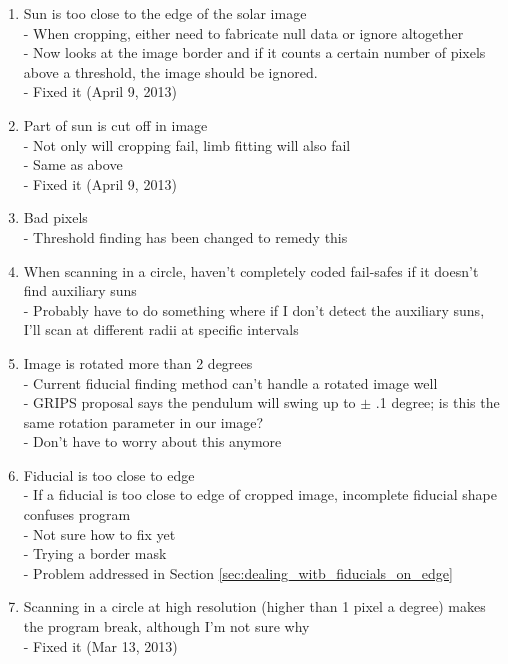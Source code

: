 \documentclass[10pt]{article}
\begin{document}
    \begin{enumerate}
        \item Sun is too close to the edge of the solar image\\
            - When cropping, either need to fabricate null data or ignore altogether\\
            - Now looks at the image border and if it counts a certain number of pixels above a threshold, the image should be ignored.\\
            - Fixed it (April 9, 2013)
        \item Part of sun is cut off in image\\
            - Not only will cropping fail, limb fitting will also fail\\
            - Same as above\\
            - Fixed it (April 9, 2013)
        \item Bad pixels\\
            - Threshold finding has been changed to remedy this
        \item When scanning in a circle, haven't completely coded fail-safes if it doesn't find auxiliary suns\\
            - Probably have to do something where if I don't detect the auxiliary suns, I'll scan at different radii at specific intervals
        \item Image is rotated more than 2 degrees\\
            - Current fiducial finding method can't handle a rotated image well\\
            - GRIPS proposal says the pendulum will swing up to $\pm$ .1 degree; is this the same rotation parameter in our image?\\
            - Don't have to worry about this anymore
        \item Fiducial is too close to edge\\
            - If a fiducial is too close to edge of cropped image, incomplete fiducial shape confuses program\\
            - Not sure how to fix yet\\
            - Trying a border mask\\
            - Problem addressed in Section \ref{sec:dealing_witb_fiducials_on_edge}
        \item Scanning in a circle at high resolution (higher than 1 pixel a degree) makes the program   break, although I'm not sure why\\
            - Fixed it (Mar 13, 2013)
    \end{enumerate}

\end{document}
